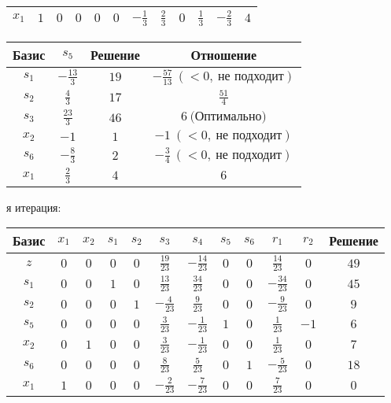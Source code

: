 \documentclass{article}%
\begin{document}
\begin{flushleft}
\begin{tabular}{|c|cccccccccc|c|}
$x_{1}$&$1$&$0$&$0$&$0$&$0$&$-\frac{1}{3}$&$\frac{2}{3}$&$0$&$\frac{1}{3}$&$-\frac{2}{3}$&$4$\\%
\hline%
\end{tabular}%
\newline%
\newline%
\newline%
\begin{tabular}{|cccc|}%
\hline%
Базис&$s_{5}$&Решение&Отношение\\%
\hline%
$s_{1}$&$-\frac{13}{3}$&$19$&$-\frac{57}{13}\: (< 0, \: \text{не подходит})$\\%
$s_{2}$&$\frac{4}{3}$&$17$&$\frac{51}{4}$\\%
$s_{3}$&$\frac{23}{3}$&$46$&$6\: \text{(Оптимально)}$\\%
$x_{2}$&$-1$&$1$&$-1\: (< 0, \: \text{не подходит})$\\%
$s_{6}$&$-\frac{8}{3}$&$2$&$-\frac{3}{4}\: (< 0, \: \text{не подходит})$\\%
$x_{1}$&$\frac{2}{3}$&$4$&$6$\\%
\hline%
\end{tabular}%
\newline%
\newline%
я итерация: %
\newline%
\newline%
\renewcommand{\arraystretch}{1.3}%
\begin{tabular}{|c|cccccccccc|c|}%
\hline%
Базис&$x_{1}$&$x_{2}$&$s_{1}$&$s_{2}$&$s_{3}$&$s_{4}$&$s_{5}$&$s_{6}$&$r_{1}$&$r_{2}$&Решение\\%
\hline%
$z$&$0$&$0$&$0$&$0$&$\frac{19}{23}$&$-\frac{14}{23}$&$0$&$0$&$\frac{14}{23}$&$0$&$49$\\%
\hline%
$s_{1}$&$0$&$0$&$1$&$0$&$\frac{13}{23}$&$\frac{34}{23}$&$0$&$0$&$-\frac{34}{23}$&$0$&$45$\\%
$s_{2}$&$0$&$0$&$0$&$1$&$-\frac{4}{23}$&$\frac{9}{23}$&$0$&$0$&$-\frac{9}{23}$&$0$&$9$\\%
$s_{5}$&$0$&$0$&$0$&$0$&$\frac{3}{23}$&$-\frac{1}{23}$&$1$&$0$&$\frac{1}{23}$&$-1$&$6$\\%
$x_{2}$&$0$&$1$&$0$&$0$&$\frac{3}{23}$&$-\frac{1}{23}$&$0$&$0$&$\frac{1}{23}$&$0$&$7$\\%
$s_{6}$&$0$&$0$&$0$&$0$&$\frac{8}{23}$&$\frac{5}{23}$&$0$&$1$&$-\frac{5}{23}$&$0$&$18$\\%
$x_{1}$&$1$&$0$&$0$&$0$&$-\frac{2}{23}$&$-\frac{7}{23}$&$0$&$0$&$\frac{7}{23}$&$0$&$0$\\%

\end{tabular}
\end{flushleft}
\end{document}
